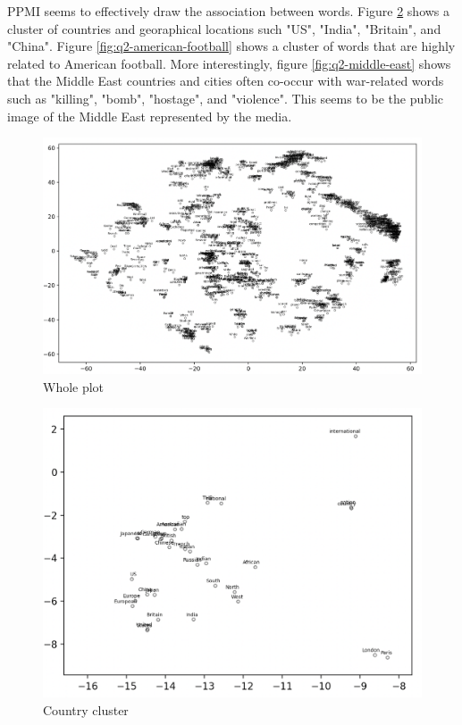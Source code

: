 \documentclass[12pt,article]{article}
\begin{document}
PPMI seems to effectively draw the association between words. Figure \ref{fig:q2-country-cluster} shows a cluster of countries and georaphical locations such "US", "India", "Britain", and "China". Figure \ref{fig:q2-american-football} shows a cluster of words that are highly related to American football. More interestingly, figure \ref{fig:q2-middle-east} shows that the Middle East countries and cities often co-occur with war-related words such as "killing", "bomb", "hostage", and "violence". This seems to be the public image of the Middle East represented by the media.

\begin{figure}[H]
    \centering
    \includegraphics[scale=0.5]{whole_plot.png} \par
    \caption{Whole plot}
    \label{fig:q2-overview}
\end{figure}


\begin{figure}[H]
    \centering
    \includegraphics[scale=0.6]{country.png} \par
    \caption{Country cluster}
    \label{fig:q2-country-cluster}
\end{figure}
\end{document}
